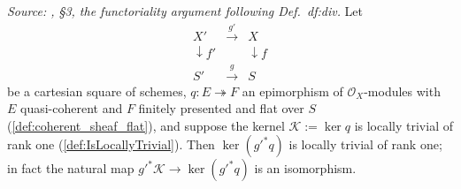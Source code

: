 \begin{lemma}\leanok
  \label{lem:relative_divisor_base_change}
  \textit{Source: \cite{kleiman-picard}, \S 3, the functoriality argument following
  Def.~df:div.}
  Let
  \[
    \begin{array}{ccc}
      X' & \xrightarrow{\ g'\ } & X \\
      \downarrow f' & & \downarrow f \\
      S' & \xrightarrow{\ g\ } & S
    \end{array}
  \]
  be a cartesian square of schemes, \(q : E \twoheadrightarrow F\) an
  epimorphism of \(\mathcal O_X\)-modules with \(E\) quasi-coherent and
  \(F\) finitely presented and flat over \(S\)
  (\cref{def:coherent_sheaf_flat}), and suppose the kernel
  \(\mathcal K := \ker q\) is locally trivial of rank one
  (\cref{def:IsLocallyTrivial}).  Then \(\ker (g'^* q)\) is locally trivial
  of rank one; in fact the natural map \(g'^* \mathcal K \to \ker(g'^* q)\)
  is an isomorphism.
\end{lemma}
